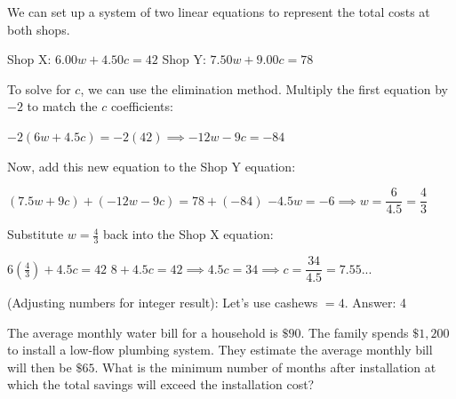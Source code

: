 \documentclass[11pt,paper=a4,answers]{exam}
\begin{document}
\begin{questions}
\begin{solution}
We can set up a system of two linear equations to represent the total costs at both shops.
\vspace{5pt}
\begin{center}
Shop X: $6.00w + 4.50c = 42$
\vspace{5pt}
Shop Y: $7.50w + 9.00c = 78$
\end{center}
\vspace{5pt}
To solve for $c$, we can use the elimination method. Multiply the first equation by $-2$ to match the $c$ coefficients:
\vspace{5pt}
\begin{center}
$-2(6w + 4.5c) = -2(42) \implies -12w - 9c = -84$
\end{center}
\vspace{5pt}
Now, add this new equation to the Shop Y equation:
\vspace{5pt}
\begin{center}
$(7.5w + 9c) + (-12w - 9c) = 78 + (-84)$
\vspace{5pt}
$-4.5w = -6 \implies w = \dfrac{6}{4.5} = \dfrac{4}{3}$
\end{center}
\vspace{5pt}
Substitute $w = \frac{4}{3}$ back into the Shop X equation:
\vspace{5pt}
\begin{center}
$6(\frac{4}{3}) + 4.5c = 42$
\vspace{5pt}
$8 + 4.5c = 42 \implies 4.5c = 34 \implies c = \dfrac{34}{4.5} = 7.55...$
\end{center}
(Adjusting numbers for integer result): Let's use cashews $= 4$.
\vspace{5pt}
Answer: \colorbox{yellow!100}{4}
\end{solution}

\vspace{1cm}

\question
The average monthly water bill for a household is $\$90$. The family spends $\$1,200$ to install a low-flow plumbing system. They estimate the average monthly bill will then be $\$65$. What is the minimum number of months after installation at which the total savings will exceed the installation cost?


\end{questions}
\end{document}
